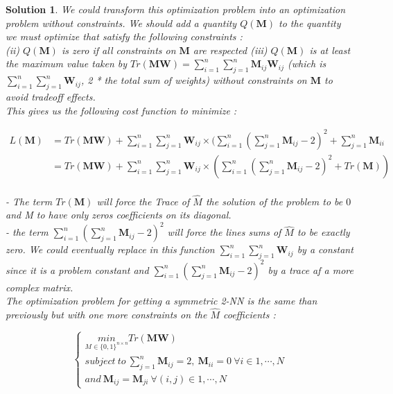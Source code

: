 \documentclass[12pt,a4paper]{article}
\newtheorem{solution}{Solution}
\begin{document}
\begin{solution}
We could transform this optimization problem into an optimization problem without constraints. We should add a quantity $Q(\boldsymbol M)$ to the quantity we must optimize that satisfy the following constraints :\\
(ii) $Q(\boldsymbol M)$ is zero if all constraints on $\boldsymbol M$ are respected
(iii) $Q(\boldsymbol M)$ is at least the maximum value taken by  $Tr(\boldsymbol M \boldsymbol W) = \sum_{i=1}^n \sum_{j=1}^n \boldsymbol M_{ij} \boldsymbol W_{ij}$ (which is  $\sum_{i=1}^n \sum_{j=1}^n \boldsymbol W_{ij}$, 2 * the total sum of weights) without constraints on $\boldsymbol M$ to avoid tradeoff effects.\\

This gives us the following cost function to minimize : 

\begin{equation}
\begin{split}
L(\boldsymbol M) & = Tr(\boldsymbol M \boldsymbol W) + \sum_{i=1}^n \sum_{j=1}^n \boldsymbol W_{ij} \times (\sum_{i=1}^n(\sum_{j=1}^n \boldsymbol M_{ij} - 2)^2  + \sum_{j=1}^n \boldsymbol M_{ii} \\
 & = Tr(\boldsymbol M \boldsymbol W) + \sum_{i=1}^n \sum_{j=1}^n \boldsymbol W_{ij} \times (\sum_{i=1}^n(\sum_{j=1}^n \boldsymbol M_{ij} - 2)^2 + Tr(\boldsymbol M))
\end{split}
\end{equation}\\
- The term $Tr(\boldsymbol M)$ will force the Trace of $\hat M$ the solution of the problem to be $0$ and M to have only zeros coefficients on its diagonal.\\
- the term $\sum_{i=1}^n(\sum_{j=1}^n \boldsymbol M_{ij} - 2)^2$ will force the lines sums of $\hat M$ to be exactly zero.
We could eventually replace in this function $\sum_{i=1}^n \sum_{j=1}^n \boldsymbol W_{ij}$ by a constant since it is a problem constant and $\sum_{i=1}^n(\sum_{j=1}^n \boldsymbol M_{ij} - 2)^2$ by a trace af a more complex matrix.\\


The optimization problem for getting a symmetric 2-NN is the same than previously but with one more constraints on the $\hat M$ coefficients : 

\[\begin{cases}
    \underset{M \in \{0,1\}^{n \times n}}{min} Tr(\boldsymbol M \boldsymbol W)\\
     subject\ to\ \sum_{j=1}^n \boldsymbol M_{ij} = 2,\ \boldsymbol M_{ii} = 0 \ \forall i \in 1,\cdots,N\\
     and \ \boldsymbol M_{ij} = \boldsymbol M_{ji} \ \forall (i,j) \in 1,\cdots,N
            \end{cases}\]\\
            

\end{solution}
\end{document}
